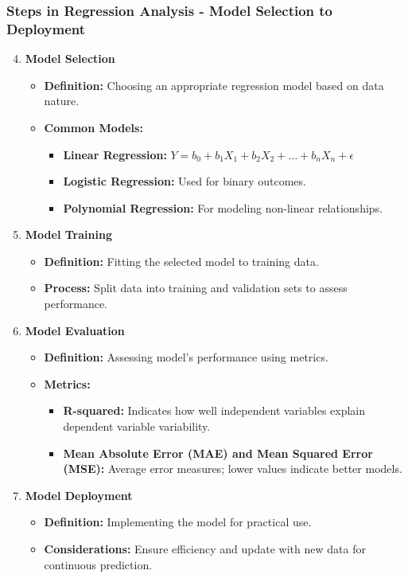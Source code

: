 \documentclass{beamer}
\begin{document}
\begin{frame}[fragile]
    \frametitle{Steps in Regression Analysis - Model Selection to Deployment}
    \begin{enumerate}
        \setcounter{enumi}{3}
        \item \textbf{Model Selection}
        \begin{itemize}
            \item \textbf{Definition:} Choosing an appropriate regression model based on data nature.
            \item \textbf{Common Models:}
            \begin{itemize}
                \item \textbf{Linear Regression:} \( Y = b_0 + b_1X_1 + b_2X_2 + \ldots + b_nX_n + \epsilon \)
                \item \textbf{Logistic Regression:} Used for binary outcomes.
                \item \textbf{Polynomial Regression:} For modeling non-linear relationships.
            \end{itemize}
        \end{itemize}

        \item \textbf{Model Training}
        \begin{itemize}
            \item \textbf{Definition:} Fitting the selected model to training data.
            \item \textbf{Process:} Split data into training and validation sets to assess performance.
        \end{itemize}
        
        \item \textbf{Model Evaluation}
        \begin{itemize}
            \item \textbf{Definition:} Assessing model's performance using metrics.
            \item \textbf{Metrics:}
            \begin{itemize}
                \item \textbf{R-squared:} Indicates how well independent variables explain dependent variable variability.
                \item \textbf{Mean Absolute Error (MAE) and Mean Squared Error (MSE):} Average error measures; lower values indicate better models.
            \end{itemize}
        \end{itemize}

        \item \textbf{Model Deployment}
        \begin{itemize}
            \item \textbf{Definition:} Implementing the model for practical use.
            \item \textbf{Considerations:} Ensure efficiency and update with new data for continuous prediction.
        \end{itemize}
    \end{enumerate}
\end{frame}
\end{document}
